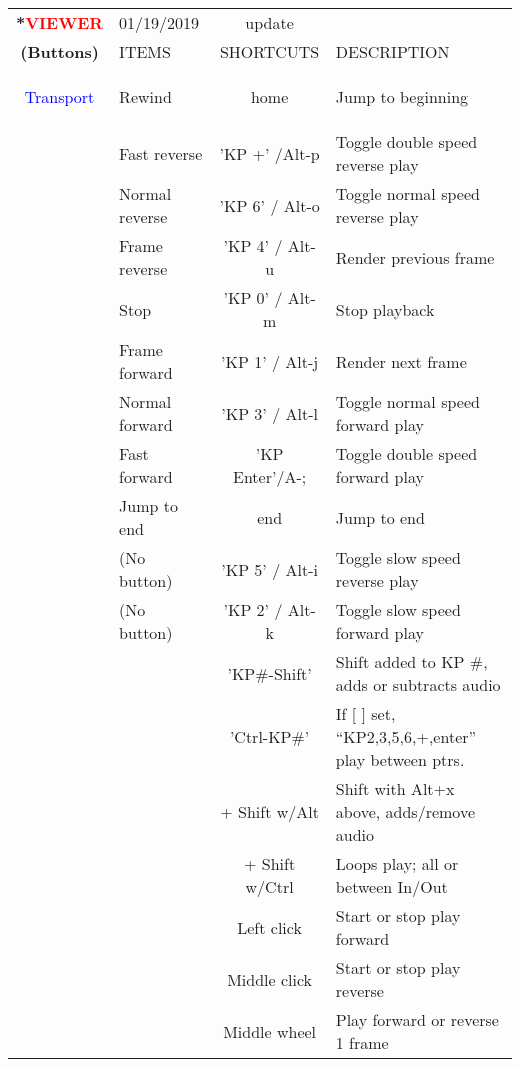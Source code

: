 \begin{center}
    \small 
    \begin{longtable}{ >{\bfseries}c l c p{6cm}}             
        \toprule
        \multirow{2}*{\textcolor{red}{VIEWER}} & 01/19/2019 & update & \\
        \noalign{\smallskip}
        \cline{2-4}
        \noalign{\smallskip}
        (Buttons) & ITEMS & SHORTCUTS & DESCRIPTION\\
        \midrule        
        \endhead   
        
        \textcolor{blue}{Transport} & Rewind & home & Jump to beginning \\        
        & Fast reverse & 'KP +' /Alt-p & Toggle double speed reverse play \\        
        & Normal reverse & 'KP 6' / Alt-o & Toggle normal speed reverse play \\        
        & Frame reverse & 'KP 4' / Alt-u & Render previous frame \\        
        & Stop & 'KP 0' / Alt-m & Stop playback \\        
        & Frame forward & 'KP 1' / Alt-j & Render next frame \\        
        & Normal forward & 'KP 3' / Alt-l & Toggle normal speed forward play \\        
        & Fast forward & 'KP Enter'/A-; & Toggle double speed forward play \\        
        & Jump to end & end & Jump to end \\        
        & (No button) & 'KP 5' / Alt-i & Toggle slow speed reverse play \\        
        & (No button) & 'KP 2' / Alt-k & Toggle slow speed forward play \\        
        &  & 'KP\#-Shift’ & Shift added to KP \#, adds or subtracts audio \\        
        &  & 'Ctrl-KP\#’ & If [ ] set, “KP2,3,5,6,+,enter” play between ptrs. \\        
        &  & + Shift w/Alt & Shift with Alt+x above, adds/remove audio \\        
        &  & + Shift w/Ctrl & Loops play; all or between In/Out \\        
        &  & Left click & Start or stop play forward \\        
        &  & Middle click & Start or stop play reverse \\        
        &  & Middle wheel & Play forward or reverse 1 frame \\        

\end{longtable}
\end{center}
